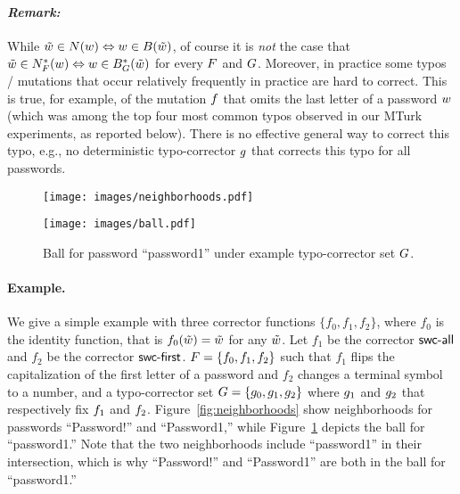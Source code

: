 \paragraph{\em Remark:} While
$\tilde{w} \in N({w}) \Leftrightarrow {w} \in B(\tilde{w})$, of
course it is {\em not} the case that
$\tilde{w} \in N^*_F({w}) \Leftrightarrow {w} \in
B^*_{G}(\tilde{w})$
for every $\mutset$ and $G$. Moreover, in practice some typos /
mutations that occur relatively frequently in practice are hard to
correct. This is true, for example, of the mutation $f$ that omits
the last letter of a password ${w}$ (which was among the top four most
common typos observed in our MTurk experiments, as reported
below). There is no effective general way to correct this typo, e.g.,
no deterministic typo-corrector $g$ that corrects this typo for all
passwords.

\begin{figure*}[t]
\centering
\begin{minipage}[b]{.35\textwidth}
  \texttt{[image: images/neighborhoods.pdf]}
\caption{Neighborhoods for passwords ``Password!'' and ``Password1'' under example mutation set $\mutset$.}\label{fig:neighborhoods}
\end{minipage}\qquad
\begin{minipage}[b]{.35\textwidth}
 \texttt{[image: images/ball.pdf]}
\caption{Ball for password ``password1'' under example typo-corrector set $G$.}\label{fig:ball}
\end{minipage}
\end{figure*}

\paragraph{Example.} We give a simple example with three corrector
functions $\{f_0, f_1, f_2\}$, where $f_0$ is the identity function,
that is $f_0(\tilde{w})=\tilde{w}$ for any $\tilde{w}$. Let $f_1$ be the
corrector $\textsf{swc-all}$ and $f_2$ be the corrector $\textsf{swc-first}$. 
$F = \{f_0, f_1, f_2\}$ such that $f_1$ flips the
capitalization of the first letter of a password and $f_2$ changes a
terminal symbol to a number, and a typo-corrector set
$G = \{g_0, g_1, g_2\}$ where $g_1$ and $g_2$ that
respectively fix $f_1$ and $f_2$. Figure~\ref{fig:neighborhoods}
show neighborhoods for passwords ``Password!'' and ``Password1,''
while Figure~\ref{fig:ball} depicts the ball for ``password1.'' Note
that the two neighborhoods include ``password1'' in their
intersection, which is why ``Password!'' and ``Password1'' are both in
the ball for ``password1.''  
\fi

